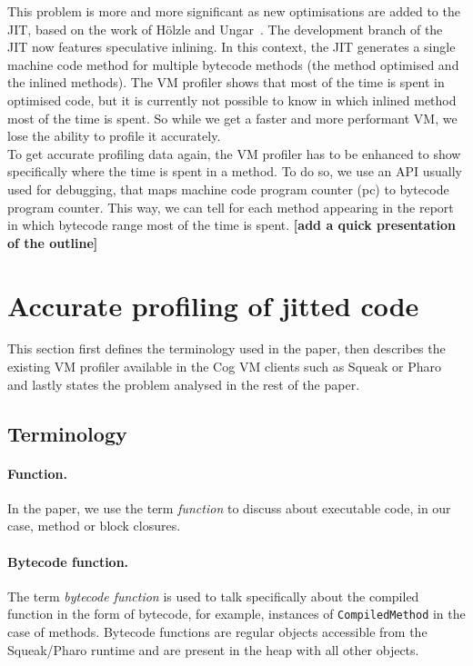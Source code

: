 \documentclass[10pt,preprint]{sigplanconf}
\newcommand{\ct}{\lstinline[backgroundcolor=\color{white},basicstyle=\footnotesize\ttfamily]}
\begin{document}
This problem is more and more significant as new optimisations are added to the JIT, based on the work of H\"olzle and Ungar~\cite{Holz94a}. The development branch of the JIT now features speculative inlining. In this context, the JIT generates a single machine code method for multiple bytecode methods (the method optimised and the inlined methods). The VM profiler shows that most of the time is spent in optimised code, but it is currently not possible to know in which inlined method most of the time is spent. So while we get a faster and more performant VM, we lose the ability to profile it accurately.\\

To get accurate profiling data again, the VM profiler has to be enhanced to show specifically where the time is spent in a method. To do so, we use an API usually used for debugging, that maps machine code program counter (pc) to bytecode program counter. This way, we can tell for each method appearing in the report in which bytecode range most of the time is spent.
\textbf{[add a quick presentation of the outline]}



\section{Accurate profiling of jitted code}

This section first defines the terminology used in the paper, then describes the existing VM profiler available in the Cog VM clients such as Squeak or Pharo and lastly states the problem analysed in the rest of the paper.

\subsection{Terminology}

\paragraph{Function.} In the paper, we use the term \emph{function} to discuss about executable code, in our case, method or block closures.

\paragraph{Bytecode function.} The term \emph{bytecode function} is used to talk specifically about the compiled function in the form of bytecode, for example, instances of \ct{CompiledMethod} in the case of methods. Bytecode functions are regular objects accessible from the Squeak/Pharo runtime and are present in the heap with all other objects.
\end{document}
